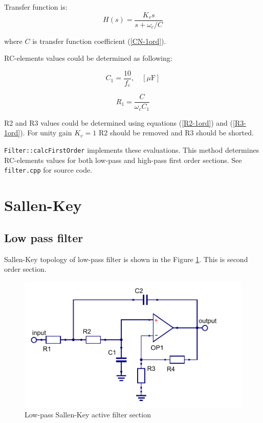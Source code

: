 Transfer function is:
\begin{equation}
 H(s)=\frac{K_v s}{s+\omega_c/C}
\end{equation}

where $C$ is transfer function coefficient (\ref{CN-1ord}).

RC-elements values could be determined as following:

\begin{equation}
 C_1 = \frac{10}{f_c}, \quad [\mu\mbox{F}]
\end{equation}

\begin{equation}
 R_1=\frac{C}{\omega_cC_1}
\end{equation}

R2 and R3 values could be determined using equations (\ref{R2-1ord}) and
(\ref{R3-1ord}). For unity gain $K_v=1$  R2 should be removed and
R3 should be shorted. 

\verb|Filter::calcFirstOrder| implements these evaluations. This method
determines RC-elements values for both low-pass and high-pass first order
sections. See \verb|filter.cpp| for source code.

\section{Sallen-Key}

\subsection{Low pass filter}

Sallen-Key topology of low-pass filter is shown in the Figure
\ref{fig:sk-lpf}. This is second order section.

\begin{figure}[!ht]
  \centering
  \includegraphics[width=0.6\linewidth]{pics/sk-lpf}
  \caption{Low-pass Sallen-Key active filter section}
  \label{fig:sk-lpf}
\end{figure}

